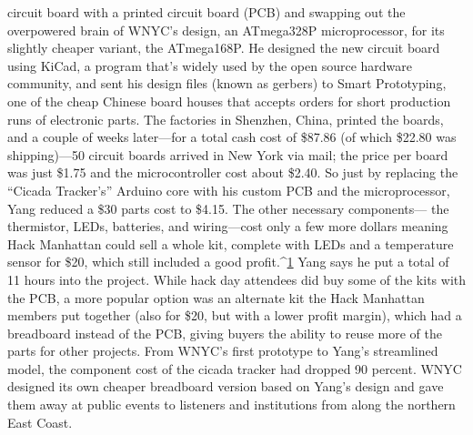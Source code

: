 circuit board with a printed circuit board (PCB) and swapping out the overpowered
brain of WNYC's design, an ATmega328P microprocessor, for its
slightly cheaper variant, the ATmega168P.
He designed the new circuit board using KiCad, a program that's widely
used by the open source hardware community, and sent his design files
(known as gerbers) to Smart Prototyping, one of the cheap Chinese board
houses that accepts orders for short production runs of electronic parts.
The factories in Shenzhen, China, printed the boards, and a couple of weeks
later—for a total cash cost of \$87.86 (of which \$22.80 was shipping)—50
circuit boards arrived in New York via mail; the price per board was just
\$1.75 and the microcontroller cost about \$2.40. So just by replacing the
``Cicada Tracker's'' Arduino core with his custom PCB and the microprocessor,
Yang reduced a \$30 parts cost to \$4.15. The other necessary components—
the thermistor, LEDs, batteries, and wiring—cost only a few more
dollars meaning Hack Manhattan could sell a whole kit, complete with
LEDs and a temperature sensor for \$20, which still included a good profit.^{\href{#endnotes-wnyc}{1}}
Yang says he put a total of 11 hours into the project. While hack day attendees
did buy some of the kits with the PCB, a more popular option was an
alternate kit the Hack Manhattan members put together (also for \$20, but
with a lower profit margin), which had a breadboard instead of the PCB,
giving buyers the ability to reuse more of the parts for other projects.
From WNYC's first prototype to Yang's streamlined model, the component
cost of the cicada tracker had dropped 90 percent. WNYC designed
its own cheaper breadboard version based on Yang's design and gave them
away at public events to listeners and institutions from along the northern
East Coast.

